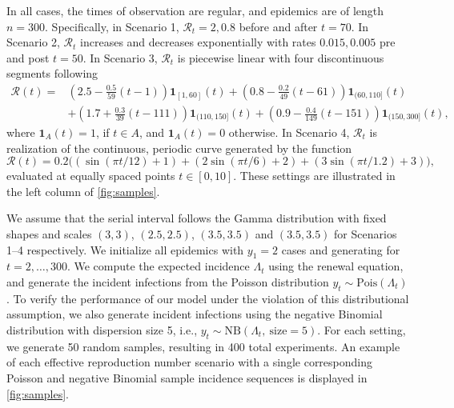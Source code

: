 \documentclass[10pt,letterpaper]{article}
\newcommand{\lr}[1]{\left(#1\right)}
\def\calR{\mathcal{R}}
\begin{document}
In all cases, the times of observation are regular, and epidemics are of
length $n=300$. Specifically, in Scenario 1, $\calR_t = 2, 0.8$ before and after
$t=70$. In Scenario 2, $\calR_t$ increases and decreases exponentially with
rates $0.015, 0.005$ pre and post $t=50$. 
In Scenario 3, $\calR_t$ is piecewise linear with four discontinuous segments following 
\begin{align*}
    \calR(t) = & \lr{2.5 - \frac{0.5}{59}\lr{t-1}} \boldsymbol{1}_{[1,60]}(t)
     + \lr{0.8 - \frac{0.2}{49}\lr{t-61}} \boldsymbol{1}_{(60,110]}(t) \\
    & + \lr{1.7 + \frac{0.3}{39}\lr{t-111}} \boldsymbol{1}_{(110,150]}(t)
     + \lr{0.9 - \frac{0.4}{149}\lr{t-151}} \boldsymbol{1}_{(150,300]}(t),
\end{align*}
where $\boldsymbol{1}_{A}(t) = 1$, if $t\in A$, and $\boldsymbol{1}_{A}(t)=0$ otherwise. 
In Scenario 4, $\calR_t$ is realization of the 
continuous, periodic curve generated by the function $$\calR(t) = 0.2 \big(
\lr{\sin(\pi t/12) + 1} + \lr{2 \sin\lr{\pi t / 6} + 2} + \lr{3
\sin(\pi t / 1.2) + 3}\big),$$ evaluated at equally spaced points $t\in [0,10]$. 
These settings are illustrated in the left column of \autoref{fig:samples}.


We assume that the serial interval follows the Gamma distribution with fixed
shapes and scales $(3,3)$, $(2.5,2.5)$, $(3.5,3.5)$ and $(3.5,3.5)$ for
Scenarios 1--4 respectively. We initialize all epidemics with $y_1=2$ cases and
generating for $t=2,\ldots,300$. We compute the expected incidence $\Lambda_t$
using the renewal equation, and generate the incident infections from the
Poisson distribution $y_t\sim \textrm{Pois}(\Lambda_t)$. To verify the
performance of our model under the violation of this distributional assumption,
we also generate incident infections using the negative Binomial distribution
with dispersion size 5, i.e., $y_t\sim \textrm{NB}(\Lambda_t,\
\textrm{size}=5)$. For each setting, we generate 50 random samples, resulting in
400 total experiments. An example of each effective reproduction number scenario
with a single corresponding Poisson and negative Binomial sample incidence
sequences is displayed in \autoref{fig:samples}. 
\end{document}
